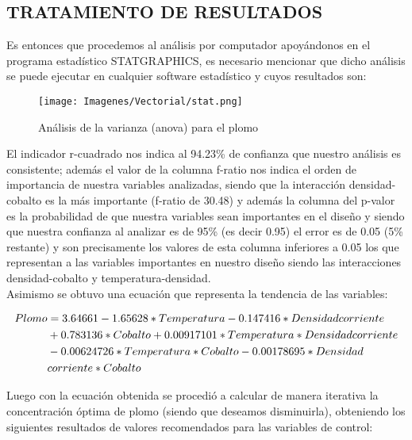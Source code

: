 \subsection{TRATAMIENTO DE RESULTADOS}
Es entonces que procedemos al an\'alisis por computador apoy\'andonos en el programa estad\'istico STATGRAPHICS, es necesario mencionar que dicho an\'alisis se puede ejecutar en cualquier software estad\'istico y cuyos resultados son:

\begin{figure}[H]
 \centering
 \texttt{[image: Imagenes/Vectorial/stat.png]}
 \caption{An\'alisis de la varianza (anova) para el plomo}
 \label{fig:sta}
\end{figure}

El indicador r-cuadrado nos indica al 94.23\% de confianza que nuestro an\'alisis es consistente; adem\'as el valor de la columna f-ratio nos indica el orden de importancia de nuestra variables analizadas, siendo que la interacci\'on densidad-cobalto es la m\'as importante (f-ratio de 30.48) y adem\'as la columna del p-valor es la probabilidad de que nuestra variables sean importantes en el dise\~no y siendo que nuestra confianza al analizar es de 95\% (es decir 0.95) el error es de 0.05 (5\% restante) y son precisamente los valores de esta columna inferiores a 0.05 los que representan a las variables importantes en nuestro dise\~no siendo las interacciones densidad-cobalto y temperatura-densidad.\\

Asimismo se obtuvo una ecuaci\'on que representa la tendencia de las variables:

\begin{equation}
 \begin{align}
Plomo &= 3.64661 - 1.65628*Temperatura - 0.147416*Densidad corriente\\
&+0.783136*Cobalto + 0.00917101*Temperatura*Densidadcorriente\\ &-0.00624726*Temperatura*Cobalto - 0.00178695*Densidad\\ &corriente*Cobalto \notag 
 \end{align}
\end{equation}

Luego con la ecuaci\'on obtenida se procedi\'o a calcular de manera iterativa la concentraci\'on \'optima de plomo (siendo que deseamos disminuirla), obteniendo los siguientes resultados de valores recomendados para las variables de control:\\

